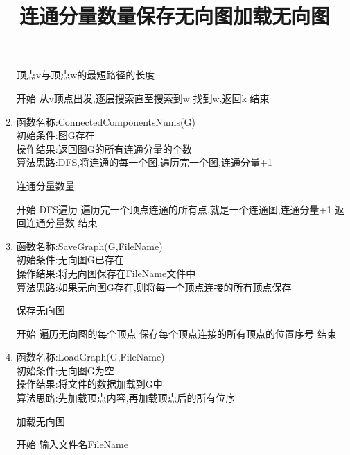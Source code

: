 \documentclass[supercite]{HustGraduPaper}
\theoremstyle{definition}
\begin{document}
\begin{enumerate}
\begin{algorithm}[htb]
		      \caption{顶点v与顶点w的最短路径的长度}
		      \begin{algorithmic}[1]
			      \State 开始
			      \State 从v顶点出发,逐层搜索直至搜索到w
			      \State 找到w,返回k
			      \State 结束
		      \end{algorithmic}\label{G14}
	      \end{algorithm}
	\item 函数名称:ConnectedComponentsNums(G)\\
	      初始条件:图G存在\\
	      操作结果:返回图G的所有连通分量的个数\\
	      算法思路:DFS,将连通的每一个图,遍历完一个图,连通分量+1
	      \begin{algorithm}[htb]
		      \title{连通分量数量}
		      \caption{连通分量数量}
		      \begin{algorithmic}[1]
			      \State 开始
			      \State DFS遍历
			      \State 遍历完一个顶点连通的所有点,就是一个连通图,连通分量+1
			      \State 返回连通分量数
			      \State 结束
		      \end{algorithmic}\label{G15}
	      \end{algorithm}
	\item 函数名称:SaveGraph(G,FileName)\\
	      初始条件:无向图G已存在\\
	      操作结果:将无向图保存在FileName文件中\\
	      算法思路:如果无向图G存在,则将每一个顶点连接的所有顶点保存
	      \begin{algorithm}[htb]
		      \title{保存无向图}
		      \caption{保存无向图}
		      \begin{algorithmic}[1]
			      \State 开始
			      \State 遍历无向图的每个顶点
			      \State 保存每个顶点连接的所有顶点的位置序号
			      \State 结束
		      \end{algorithmic}\label{G16}
	      \end{algorithm}
	\item 函数名称:LoadGraph(G,FileName)\\
	      初始条件:无向图G为空\\
	      操作结果:将文件的数据加载到G中\\
	      算法思路:先加载顶点内容,再加载顶点后的所有位序
	      \begin{algorithm}[htb]
		      \title{加载无向图}
		      \caption{加载无向图}
		      \begin{algorithmic}[1]
			      \State 开始
			      \State 输入文件名FileName

\end{algorithmic}
\end{algorithm}
\end{enumerate}
\end{document}
